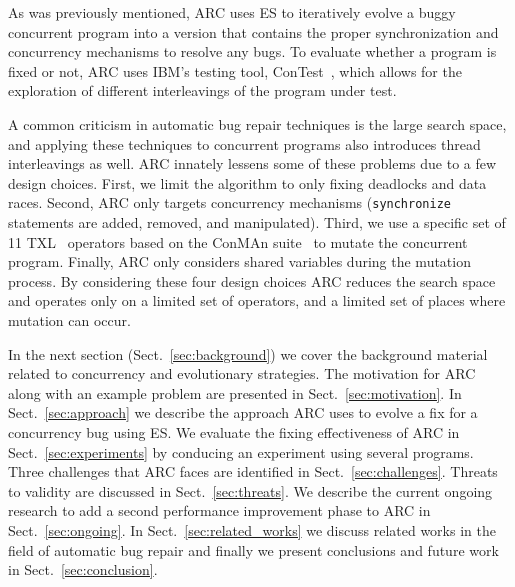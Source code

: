 As was previously mentioned, ARC uses ES to iteratively evolve a buggy concurrent program into a version that contains the proper synchronization and concurrency mechanisms to resolve any bugs. To evaluate
whether a program is fixed or not, ARC uses IBM's testing tool,
ConTest~\cite{EFN+02}, which allows for the exploration of different interleavings of
the program under test.

A common criticism in automatic bug repair techniques is the large search space, and applying these techniques to  concurrent programs also introduces thread interleavings as well.
ARC innately lessens some of these problems due to a few design choices. First,
we limit the algorithm to only fixing deadlocks and data races. Second, ARC
only targets concurrency mechanisms (\texttt{synchronize} statements are added,
removed, and manipulated). Third, we use a specific set of 11 TXL~\cite{CHP91}
operators based on the ConMAn suite~\cite{BCD06} to mutate the concurrent
program.  Finally, ARC only considers shared variables during the mutation
process. By considering these four design choices ARC reduces the search space and operates only on a limited set
of operators, and a limited set of places where mutation can occur.

In the next section (Sect.~\ref{sec:background}) we cover the background material related to concurrency and evolutionary strategies. The motivation for ARC along with an example
problem are presented in Sect.~\ref{sec:motivation}. In
Sect.~\ref{sec:approach} we describe the approach ARC uses to evolve a fix for
a concurrency bug using ES. We evaluate the fixing effectiveness of ARC in
Sect.~\ref{sec:experiments} by conducing an experiment using several programs.
Three challenges that ARC faces are identified in Sect.~\ref{sec:challenges}.
Threats to validity are discussed in Sect.~\ref{sec:threats}. We describe the
current ongoing research to add a second performance improvement phase to ARC in Sect.~\ref{sec:ongoing}. In
Sect.~\ref{sec:related_works} we discuss related works in the field of
automatic bug repair and finally we present conclusions and future work in
Sect.~\ref{sec:conclusion}.


